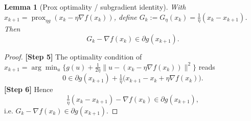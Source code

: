 \documentclass[11pt]{article}
\newtheorem{lemma}{Lemma}
\begin{document}
\begin{lemma}[Prox optimality / subgradient identity]\label{lem:proxopt}
With $x_{k+1} = \operatorname{prox}_{\eta g}(x_k - \eta\nabla f(x_k))$, define $G_k := G_\eta(x_k) = \tfrac{1}{\eta}(x_k - x_{k+1})$. Then
\[
G_k - \nabla f(x_k) \in \partial g(x_{k+1}).
\]
\end{lemma}
\begin{proof}
\textbf{[Step 5]} The optimality condition of $x_{k+1}=\arg\min_u \{g(u) + \tfrac{1}{2\eta}\|u - (x_k-\eta\nabla f(x_k))\|^2\}$ reads
\[
0 \in \partial g(x_{k+1}) + \tfrac{1}{\eta}\bigl(x_{k+1} - x_k + \eta\nabla f(x_k)\bigr).
\]
\textbf{[Step 6]} Hence
\[
\tfrac{1}{\eta}(x_k - x_{k+1}) - \nabla f(x_k) \in \partial g(x_{k+1}),
\]
i.e. $G_k - \nabla f(x_k) \in \partial g(x_{k+1})$. \qedhere
\end{proof}
\end{document}
